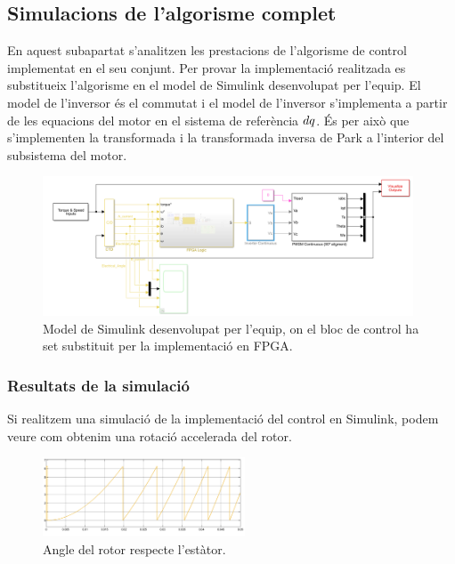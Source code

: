\subsection{Simulacions de l'algorisme complet}
{
    En aquest subapartat s'analitzen les prestacions de l'algorisme de control
    implementat en el seu conjunt. Per provar la implementació realitzada es
    substitueix l'algorisme en el model de Simulink desenvolupat per l'equip.
    El model de l'inversor és el commutat i el model de l'inversor s'implementa
    a partir de les equacions del motor en el sistema de referència $d\-q$. És
    per això que s'implementen la transformada i la transformada inversa
    de Park a l'interior del subsistema del motor. 

    \begin{figure}[!htb]
        \centering
        \captionsetup{justification=centering,margin=1cm}
        \includegraphics[width=11cm]
            {img/5_resultats/control.png}
        \caption[Model de Simulink desenvolupat per l'equip]{ Model de Simulink desenvolupat per l'equip, on el bloc de control ha set substituit per la implementació en FPGA. }
    \end{figure}

    \subsubsection{ Resultats de la simulació }
    {
        Si realitzem una simulació de la implementació del control en Simulink,
        podem veure com obtenim una rotació accelerada del rotor.

        \begin{figure}[!htb]
            \centering
            \captionsetup{justification=centering,margin=1.5cm}
            \includegraphics[width=6cm]
                {img/5_resultats/angle.png}
            \caption{ Angle del rotor respecte l'estàtor. }
        \end{figure}

}}
